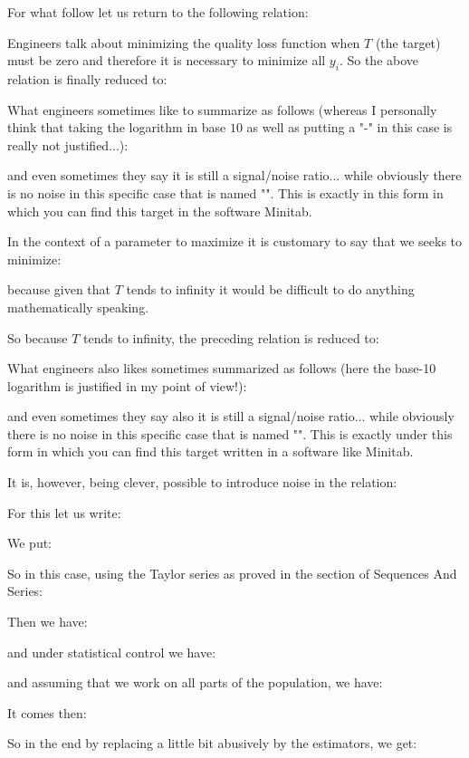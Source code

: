 	For what follow let us return to the following relation:
	
	Engineers talk about minimizing the quality loss function when $T$ (the target) must be zero and therefore it is necessary to minimize all $y_i$. So the above relation is finally reduced to:
	
	What engineers sometimes like to summarize as follows (whereas I personally think that taking the logarithm in base $10$ as well as putting a "-" in this case is really not justified...):
	
	and even sometimes they say it is still a signal/noise ratio... while obviously there is no noise in this specific case that is named "". This is exactly in this form in which you can find this target in the software Minitab.
	
	In the context of a parameter to maximize it is customary to say that we seeks to minimize:
	
	because given that $T$ tends to infinity it would be difficult to do anything mathematically speaking.
	
	So because $T$ tends to infinity, the preceding relation is reduced to:
	
	What engineers also likes sometimes summarized as follows (here the base-10 logarithm is justified in my point of view!):
	
	and even sometimes they say also it is still a signal/noise ratio... while obviously there is no noise in this specific case that is named "". This is exactly  under this form in which you can find this target written in a software like Minitab.
	
	It is, however, being clever, possible to introduce noise in the relation:
	
	For this let us write:
	
	We put:
	
	So in this case, using the Taylor series as proved in the section of Sequences And Series:
	
	Then we have:
	
	and under statistical control we have:
	
	and assuming that we work on all parts of the population, we have:
	
	It comes then:
	
	So in the end by replacing a little bit abusively by the estimators, we get:
	
	
	\pagebreak

